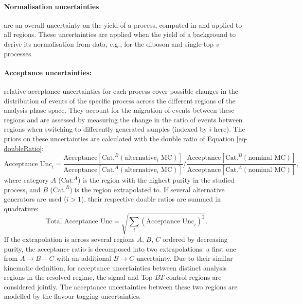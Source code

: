 \paragraph{Normalisation uncertainties} are an overall uncertainty on the yield of a process, computed in and applied to all regions. These uncertainties are applied when the yield of a background to derive its normalisation from data, e.g., for the diboson and single-top $s$ processes.

\paragraph{Acceptance uncertainties:} relative acceptance uncertainties for each process cover possible changes in the distribution of events of the specific process across the different regions of the analysis phase space. They account for the migration of events between these regions and are assessed by measuring the change in the ratio of events between regions when switching to differently generated samples (indexed by $i$ here). The priors on these uncertainties are calculated with the double ratio of Equation \ref{eq-doubleRatio}:
\begin{equation}\label{eq-doubleRatio}
    \text{Acceptance Unc}_i = \frac{\text{Acceptance}[\text{Cat.}^B (\mathrm{alternative}_i\mathrm{\,\,MC})]}{\text{Acceptance}[\text{Cat.}^A (\mathrm{alternative}_i\mathrm{\,\,MC})]} \Bigg/ \frac{\text{Acceptance}[\text{Cat.}^B (\mathrm{nominal\,\,MC})]}{\text{Acceptance}[\text{Cat.}^A (\mathrm{nominal\,\,MC})]},
\end{equation}
where category $A$ ($\text{Cat.}^A$) is the region with the highest purity in the studied process, and $B$ ($\text{Cat.}^B$) is the region extrapolated to. If several alternative generators are used ($i > 1$), their respective double ratios are summed in quadrature: \[ \text{Total Acceptance Unc} = \sqrt{\sum_i\left(\text{Acceptance Unc}_i\right)^2}.\] If the extrapolation is across several regions $A$, $B$, $C$ ordered by decreasing purity, the acceptance ratio is decomposed into two extrapolations: a first one from $A \rightarrow B+C$ with an additional $B \rightarrow C$ uncertainty. Due to their similar kinematic definition, for acceptance uncertainties between distinct analysis regions in the resolved regime, the signal and Top $BT$ control regions are considered jointly. The acceptance uncertainties between these two regions are modelled by the flavour tagging uncertainties.

